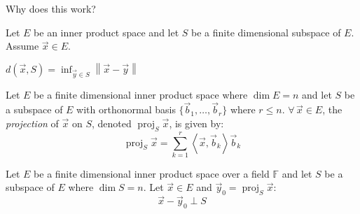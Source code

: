 \documentclass[letterpaper,12pt,fleqn]{article}
\newcommand{\vb}{\vec{b}}
\newcommand{\vx}{\vec{x}}
\newcommand{\vy}{\vec{y}}
\newcommand{\vo}{\vec{0}}
\newcommand{\norm}[1]{\left\|#1\right\|}
\newcommand{\inner}[1]{\left<#1\right>}
\newcommand{\F}{\mathbb{F}}
\DeclareMathOperator{\proj}{proj}
\begin{document}
Why does this work?

Let $E$ be an inner product space and let $S$ be a finite dimensional
subspace of $E$. Assume $\vx\in E$.

\begin{minipage}{3in}
\end{minipage}
\begin{minipage}{3in}
  $d(\vx,S)=\inf_{\vy\in S}\norm{\vx-\vy}$
\end{minipage}

\begin{definition}
  Let $E$ be a finite dimensional inner product space where $\dim E=n$ and let
  $S$ be a subspace of $E$ with orthonormal basis $\{\vb_1,\ldots,\vb_r\}$
  where $r\le n$. $\forall\,\vx\in E$, the \emph{projection} of $\vx$ on $S$,
  denoted $\proj_S{\vx}$, is given by:
  \[\proj_S{\vx}=\sum_{k=1}^r\inner{\vx,\vb_k}\vb_k\]
\end{definition}

\begin{lemma}
  Let $E$ be a finite dimensional inner product space over a field $\F$ and let
  $S$ be a subspace of $E$ where $\dim{S}=n$. Let $\vx\in E$ and
  $\vy_0=\proj_S{\vx}$:
  \[\vx-\vy_0\perp S\]
\end{lemma}
\end{document}
